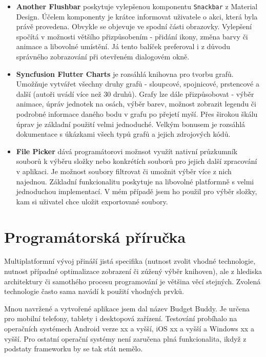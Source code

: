 \documentclass[
  biblatex,
  figures=true,
  tables=false,
  glossaries,
  index
]{kidiplom}
\begin{document}
\begin{itemize}
  \item \textbf{Another Flushbar} poskytuje vylepšenou komponentu \verb|Snackbar| z Material Design. Účelem komponenty je krátce informovat uživatele o akci, která byla právě provedena. Obvykle se objevuje ve spodní části obrazovky. Vylepšení spočítá v možnosti většího přizpůsobením - přidání ikony, změna barvy či animace a libovolné umístění. Já tento balíček preferoval i z důvodu správného zobrazování při otevřeném dialogovém okně.
  \item \textbf{Syncfusion Flutter Charts} je rozsáhlá knihovna pro tvorbu grafů. Umožňuje vytvářet všechny druhy grafů - sloupcové, spojnicové, prstencové a další (autoři uvádí více než 30 druhů). Grafy lze dále přizpůsobovat - výběr animace, úpráv jednotek na osách, výběr barev, možnost zobrazit legendu či podrobné informace daného bodu v grafu po přejetí myší. Přes širokou škálu úprav je základní použití velmi jednoduché. Velkým bonusem je rozsáhlá dokumentace s úkázkami všech typů grafů a jejich zdrojových kódů.
  \item \textbf{File Picker} dává programátorovi možnsot využít nativní průzkumník souborů k výběru složky nebo konkrétích souborů pro jejich další zpracování v aplikaci. Je možnost soubory filtrovat či umožnit výběr více z nich najednou. Základní funkcionalitu poskytuje na libovolné platformně s velmi jednoduchou implementací. V mém případě jsem ho použil pro výběr složky, kam si uživatel chce uložit exportované soubory. 

\end{itemize}


\section{Programátorská příručka}

Multiplatformní vývoj přináší jistá specifika (nutnost zvolit vhodné technologie, nutnost případné optimalizace zobrazení či zúžený výběr knihoven), ale z hlediska architektury či samothého procesu programování je většina věcí stejných. Zvolená technologie často sama navádí k použití vhodných prvků.

Mnou navržené a vytvořené aplikace jsem dal název Budget Buddy. Je určena pro mobilní telefony, tablety i desktopová zařízení. Testování probíhalo na operačních systémech Android verze xx a vyšší, iOS xx a vyšší a Windows xx a vyšší. Pro ostatní operační systémy není zaručena plná funkcionalita, ikdyž z podstaty frameworku by se tak stát nemělo.
\end{document}
